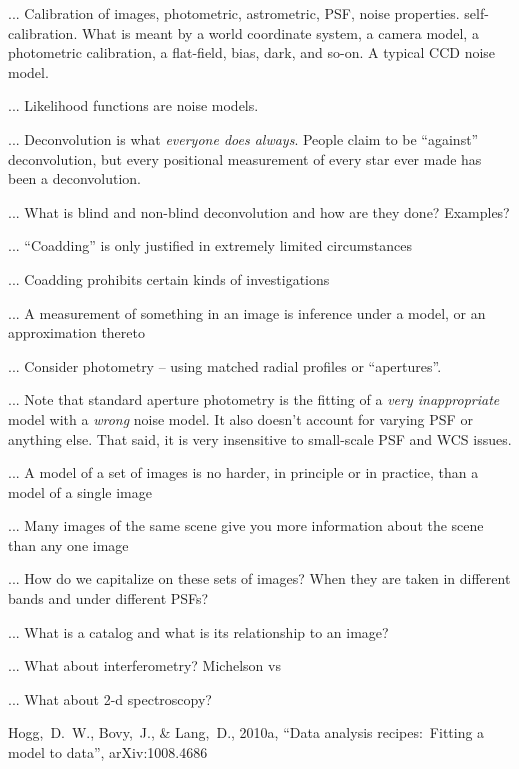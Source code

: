 \documentclass[12pt,twoside,pdftex]{article}
\begin{document}
... Calibration of images, photometric, astrometric, PSF, noise
properties.  self-calibration.  What is meant by a world coordinate
system, a camera model, a photometric calibration, a flat-field, bias,
dark, and so-on.  A typical CCD noise model.

... Likelihood functions are noise models.

... Deconvolution is what \emph{everyone does always}.  People claim
to be ``against'' deconvolution, but every positional measurement of
every star ever made has been a deconvolution.

... What is blind and non-blind deconvolution and how are they done?
Examples?
 
... ``Coadding'' is only justified in extremely limited circumstances

... Coadding prohibits certain kinds of investigations

... A measurement of something in an image is inference under a model,
or an approximation thereto

... Consider photometry -- using matched radial profiles or
``apertures''.

... Note that standard aperture photometry is the fitting of a
\emph{very inappropriate} model with a \emph{wrong} noise model.  It
also doesn't account for varying PSF or anything else.  That said, it
is very insensitive to small-scale PSF and WCS issues.

... A model of a set of images is no harder, in principle or in practice, than a model of a single image

... Many images of the same scene give you more information about the scene than any one image

... How do we capitalize on these sets of images?  When they are taken in different bands and under different PSFs?

... What is a catalog and what is its relationship to an image?

... What about interferometry?  Michelson vs 

... What about 2-d spectroscopy?

\clearpage
{}\theendnotes

\clearpage
\begin{thebibliography}{}\raggedright
{}
  Hogg,~D.~W., Bovy,~J., \& Lang,~D., 2010a,
  ``Data analysis recipes:\ Fitting a model to data'', arXiv:1008.4686
\end{thebibliography}
\end{document}
